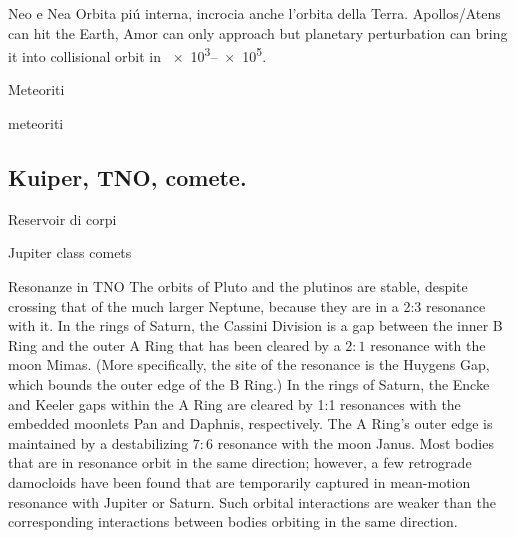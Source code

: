 \begin{wordonframe}{Neo e Nea}
Orbita pi\'u interna, incrocia anche l'orbita della Terra. Apollos/Atens can hit the Earth, Amor can only approach but planetary perturbation can bring it into collisional orbit in \SIrange{e3}{e5}{\year}. 

\end{wordonframe}

\begin{frame}{Meteoriti}

\end{frame}

\begin{wordonframe}{meteoriti}

\end{wordonframe}

\subsection{Kuiper, TNO, comete.}

\begin{frame}{Reservoir di corpi}

\end{frame}

\begin{wordonframe}{Jupiter class comets}

\end{wordonframe}

\begin{frame}{Resonanze in TNO}
The orbits of Pluto and the plutinos are stable, despite crossing that of the much larger Neptune, because they are in a 2:3 resonance with it.
In the rings of Saturn, the Cassini Division is a gap between the inner B Ring and the outer A Ring that has been cleared by a $2:1$ resonance with the moon Mimas. (More specifically, the site of the resonance is the Huygens Gap, which bounds the outer edge of the B Ring.)
    In the rings of Saturn, the Encke and Keeler gaps within the A Ring are cleared by 1:1 resonances with the embedded moonlets Pan and Daphnis, respectively. The A Ring's outer edge is maintained by a destabilizing $7:6$ resonance with the moon Janus.
Most bodies that are in resonance orbit in the same direction; however, a few retrograde damocloids have been found that are temporarily captured in mean-motion resonance with Jupiter or Saturn. Such orbital interactions are weaker than the corresponding interactions between bodies orbiting in the same direction.
\end{frame}

